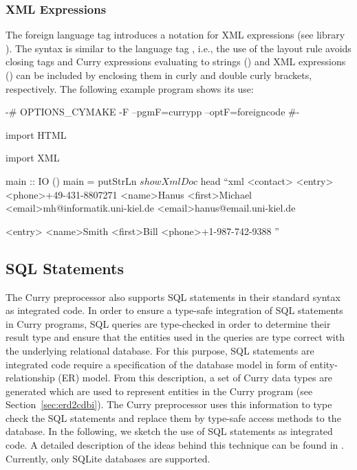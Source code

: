 \subsubsection{XML Expressions}

The foreign language tag  introduces a notation
for XML expressions (see \CYS library ).
The syntax is similar to the language tag ,
i.e., the use of the layout rule avoids closing tags
and Curry expressions evaluating to strings ()
and XML expressions () can be included by enclosing
them in curly and double curly brackets, respectively.
The following example program shows its use:
\begin{currynomath}
{-# OPTIONS_CYMAKE -F --pgmF=currypp --optF=foreigncode #-}

import HTML

import XML

main :: IO ()
main = putStrLn $ showXmlDoc $ head ``xml
 <contact>
  <entry>
   <phone>+49-431-8807271
   <name>Hanus
   <first>Michael
   <email>mh@informatik.uni-kiel.de
   <email>hanus@email.uni-kiel.de
   
  <entry>
   <name>Smith
   <first>Bill
   <phone>+1-987-742-9388
 ''
\end{currynomath}

\subsection{SQL Statements}
\label{sec:integratedsql}

The Curry preprocessor also supports SQL statements in their
standard syntax as integrated code.
In order to ensure a type-safe integration of SQL statements
in Curry programs, SQL queries are type-checked in order to
determine their result type and ensure that the
entities used in the queries are type correct with the
underlying relational database.
For this purpose, SQL statements are integrated code
require a specification of the database model
in form of entity-relationship (ER) model.
From this description, a set of Curry data types are generated
which are used to represent entities in the Curry program
(see Section~\ref{sec:erd2cdbi}).
The Curry preprocessor uses this information to type check
the SQL statements and replace them by type-safe access
methods to the database.
In the following, we sketch the use of SQL statements
as integrated code.
A detailed description of the ideas behind this technique
can be found in \cite{HanusKrone17EPTCS}.
Currently, only SQLite databases are supported.


